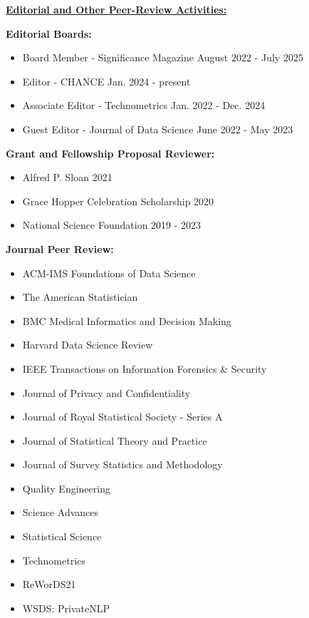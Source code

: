 \professionalspace
\underline{\textbf{\large Editorial and Other Peer-Review Activities:}}\normalsize

\textbf{Editorial Boards:}
\begin{itemize}
    \item Board Member - Significance Magazine \hfill August 2022 - July 2025
    \item Editor - CHANCE \hfill Jan. 2024 - present
    \item Associate Editor - Technometrics \hfill Jan. 2022 - Dec. 2024
    \item Guest Editor - Journal of Data Science \hfill June 2022 - May 2023
\end{itemize}

\vspace{5pt}
\textbf{Grant and Fellowship Proposal Reviewer:}
\begin{itemize}
    \item Alfred P. Sloan \hfill 2021
    \item Grace Hopper Celebration Scholarship \hfill 2020
    \item National Science Foundation \hfill 2019 - 2023
\end{itemize}

\vspace{5pt}
\textbf{Journal Peer Review:}
\vspace{-10pt}
\begin{multicols}{2}
    \begin{itemize}
        \item ACM-IMS Foundations of Data Science
        \item The American Statistician
        \item BMC Medical Informatics and Decision Making
        \item Harvard Data Science Review
        \item IEEE Transactions on Information Forensics \& Security
        \item Journal of Privacy and Confidentiality
        \item Journal of Royal Statistical Society - Series A
        \item Journal of Statistical Theory and Practice
        \item Journal of Survey Statistics and Methodology
        \item Quality Engineering
        \item Science Advances
        \item Statistical Science
        \item Technometrics
        \item ReWorDS21
        \item WSDS: PrivateNLP
    \end{itemize}
\end{multicols}

